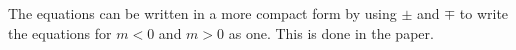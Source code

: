 \documentclass[10pt]{scrartcl}
\begin{document}
The equations can be written in a more compact form by using $\pm$ and $\mp$ to write the equations for $m<0$ and $m>0$ as one. This is done in the paper.

%
%
\end{document}
